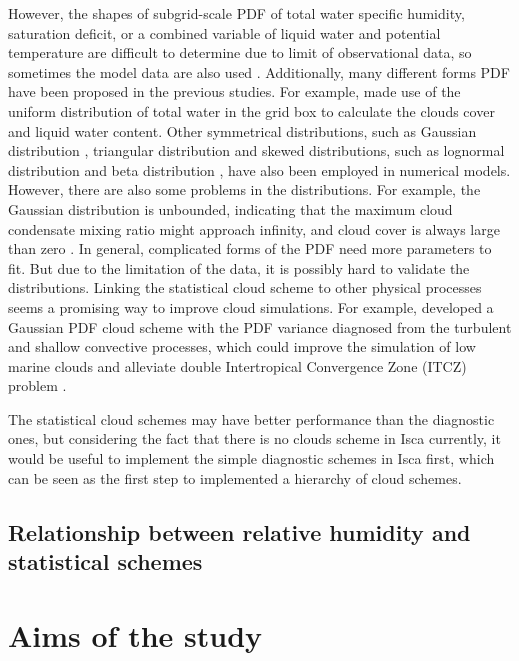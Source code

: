 However, the shapes of subgrid-scale PDF of total water specific
humidity, saturation deficit, or a combined variable of liquid water and potential temperature are difficult to determine due to limit of observational data, so sometimes the model data are also used \citep{Bony2001}. Additionally, many different forms PDF have been proposed in the previous studies. For example, \cite{LeTreut1991} made use of the uniform distribution of total water in the grid box to calculate the clouds cover and liquid water content. Other symmetrical distributions, such as Gaussian distribution \citep{Sommeria1977}, triangular distribution \citep{Smith1990} and skewed distributions, such as lognormal distribution \citep{Bony2001} and beta distribution \citep{Tompkins2002}, have also been employed in numerical models. However, there are also some problems in the distributions. For example, the Gaussian distribution is unbounded, indicating that the maximum cloud condensate mixing ratio might approach infinity, and cloud cover is always large than zero \citep{Tompkins2002}. In general, complicated forms of the PDF need more parameters to fit. But due to the limitation of the data, it is possibly hard to validate the distributions. Linking the statistical cloud scheme to other physical processes seems a promising way to improve cloud simulations. For example, \cite{Qin2018} developed a Gaussian PDF cloud scheme with the PDF variance diagnosed from the turbulent
and shallow convective processes, which could improve the simulation of low marine clouds and alleviate double Intertropical Convergence Zone (ITCZ) problem \citep{Qin2018alleviated}.

The statistical cloud schemes may have better performance than the diagnostic ones, but considering the fact that there is no clouds scheme in Isca currently, it would be useful to implement the simple diagnostic schemes in Isca first, which can be seen as the first step to implemented a hierarchy of cloud schemes.

\subsection{Relationship between relative humidity and statistical schemes}


\section{Aims of the study}
\label{sec:why_simple_cld_schem_in_isca}

